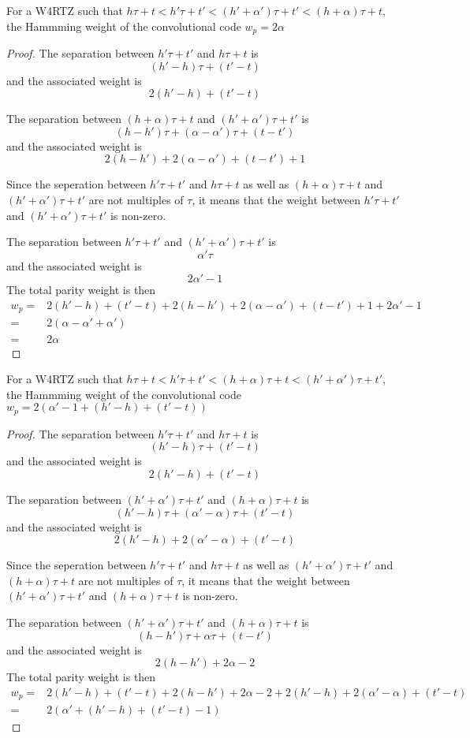 \documentclass[11pt, oneside, dvipdfmx]{book}
\begin{document}
\begin{theorem}
For a W4RTZ such that $h\tau+t<h'\tau+t'<(h' + \alpha')\tau+t'<(h + \alpha)\tau+t$, the Hammming weight of the convolutional code $w_p=2\alpha$
\end{theorem}
\begin{proof}
The separation between $h'\tau+t'$ and $h\tau+t$ is
$$(h'-h)\tau + (t'-t)$$ and the associated weight is $$2(h'-h) +(t'-t)$$

The separation between $(h + \alpha)\tau+t$ and $(h' + \alpha')\tau+t'$ is
$$(h-h')\tau+(\alpha-\alpha')\tau + (t -t')$$ and the associated weight is $$2(h-h')+2(\alpha - \alpha') +(t-t') +1$$

Since the seperation between 
$h'\tau+t'$ and $h\tau+t$ as well as 
$(h + \alpha)\tau+t$ and $(h' + \alpha')\tau+t'$ 
are not multiples of $\tau$, it means that the weight between 
$h'\tau+t'$ and $(h' + \alpha')\tau+t'$ is non-zero. 

The separation between $h'\tau+t'$ and $(h' + \alpha')\tau+t'$ is $$\alpha'\tau$$ and the associated weight is $$2\alpha' -1$$
The total parity weight is then
\begin{equation}
\begin{split}
w_p=&2(h'-h) +(t'-t) + 2(h-h')+2(\alpha - \alpha') +(t-t') +1 +2\alpha' -1\\
=&2(\alpha - \alpha' + \alpha') \\
=&2\alpha 
\end{split}
\end{equation}
\end{proof}

\begin{theorem}
For a W4RTZ such that $h\tau+t<h'\tau+t'<(h + \alpha)\tau+t<(h' + \alpha')\tau+t'$, the Hammming weight of the convolutional code $w_p=2(\alpha' -1+(h'-h)+(t'-t))$
\end{theorem}
\begin{proof}
The separation between $h'\tau+t'$ and $h\tau+t$ is
$$(h'-h)\tau + (t'-t)$$ and the associated weight is $$2(h'-h) +(t'-t)$$

The separation between $(h' + \alpha')\tau+t'$ and $(h + \alpha)\tau+t$ is
$$(h'-h)\tau+(\alpha'-\alpha)\tau + (t' -t)$$ and the associated weight is $$2(h'-h)+2(\alpha' - \alpha) +(t'-t)$$

Since the seperation between 
$h'\tau+t'$ and $h\tau+t$ as well as 
$(h' + \alpha')\tau+t'$ and $(h + \alpha)\tau+t$ 
are not multiples of $\tau$, it means that the weight between 
$(h' + \alpha')\tau+t'$ and $(h + \alpha)\tau+t$ is non-zero. 

The separation between $(h' + \alpha')\tau+t'$ and $(h + \alpha)\tau+t$ is 
$$(h-h')\tau +\alpha\tau +(t-t')$$ 
and the associated weight is $$2(h-h')+2\alpha -2$$
The total parity weight is then
\begin{equation}
\begin{split}
w_p=&2(h'-h) +(t'-t) + 2(h-h')+2\alpha -2 +2(h'-h) +2(\alpha' -\alpha)+(t'-t) \\
=&2(\alpha' +(h'-h) +(t'-t)-1)
\end{split}
\end{equation}
\end{proof}
\end{document}
